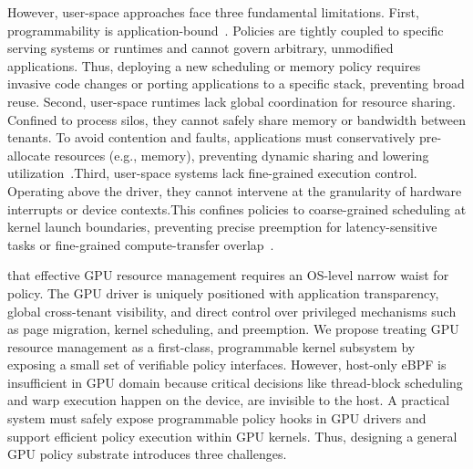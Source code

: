 However, user-space approaches face three fundamental limitations. First, programmability is application-bound~\cite{ng2023paella,wang2024gcaps}. Policies are tightly coupled to specific serving systems or runtimes and cannot govern arbitrary, unmodified applications. Thus, deploying a new scheduling or memory policy requires invasive code changes or porting applications to a specific stack, preventing broad reuse. Second, user-space runtimes lack global coordination for resource sharing. Confined to process silos, they cannot safely share memory or bandwidth between tenants. To avoid contention and faults, applications must conservatively pre-allocate resources (e.g., memory), preventing dynamic sharing and lowering utilization~\cite{wu2024streambox}.Third, user-space systems lack fine-grained execution control. Operating above the driver, they cannot intervene at the granularity of hardware interrupts or device contexts.This confines policies to coarse-grained scheduling at kernel launch boundaries, preventing precise preemption for latency-sensitive tasks or fine-grained compute-transfer overlap~\cite{fan2025gpreempt}. 

 that effective GPU resource management requires an OS-level narrow waist for policy. The GPU driver is uniquely positioned with application transparency, global cross-tenant visibility, and direct control over privileged mechanisms such as page migration, kernel scheduling, and preemption. We propose treating GPU resource management as a first-class, programmable kernel subsystem by exposing a small set of verifiable policy interfaces. 
 
However, host-only eBPF is insufficient in GPU domain because critical decisions like thread-block scheduling and warp execution happen on the device, are invisible to the host. 
A practical system must safely expose programmable policy hooks in GPU drivers and support efficient policy execution within GPU kernels. 
Thus, designing a general GPU policy substrate introduces three challenges.


